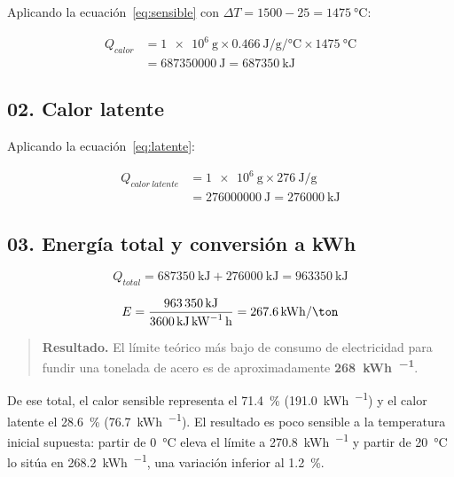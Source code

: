 \documentclass[11pt,letterpaper]{article}
\begin{document}
Aplicando la ecuación~\eqref{eq:sensible} con $\Delta T = 1500 - 25 =
\SI{1475}{\celsius}$:

\begin{align}
  Q_{calor} &= \SI{1e6}{\gram} \times \SI{0.466}{\joule\per\gram\per\celsius}
    \times \SI{1475}{\celsius} \nonumber \\
  &= \SI{687350000}{\joule} = \SI{687350}{\kilo\joule}
\end{align}

\subsection*{02. Calor latente}

Aplicando la ecuación~\eqref{eq:latente}:

\begin{align}
  Q_{calor\ latente} &= \SI{1e6}{\gram} \times \SI{276}{\joule\per\gram}
    \nonumber \\
  &= \SI{276000000}{\joule} = \SI{276000}{\kilo\joule}
\end{align}

\subsection*{03. Energía total y conversión a kWh}

\begin{equation}
  Q_{total} = \SI{687350}{\kilo\joule} + \SI{276000}{\kilo\joule}
  = \SI{963350}{\kilo\joule}
\end{equation}

\begin{equation}
  E = \frac{\SI{963350}{\kilo\joule}}{\SI{3600}{\kilo\joule\per\kWh}}
  = \SI{267.6}{\kWh\per\ton}
  \label{eq:limite}
\end{equation}

\begin{quote}
\textbf{Resultado.} El límite teórico más bajo de consumo de electricidad para
fundir una tonelada de acero es de aproximadamente
\textbf{\SI{268}{\kWh\per\ton}}.
\end{quote}

De ese total, el calor sensible representa el \SI{71.4}{\percent}
(\SI{191.0}{\kWh\per\ton}) y el calor latente el \SI{28.6}{\percent}
(\SI{76.7}{\kWh\per\ton}). El resultado es poco sensible a la temperatura
inicial supuesta: partir de \SI{0}{\celsius} eleva el límite a
\SI{270.8}{\kWh\per\ton} y partir de \SI{20}{\celsius} lo sitúa en
\SI{268.2}{\kWh\per\ton}, una variación inferior al \SI{1.2}{\percent}.
\end{document}
